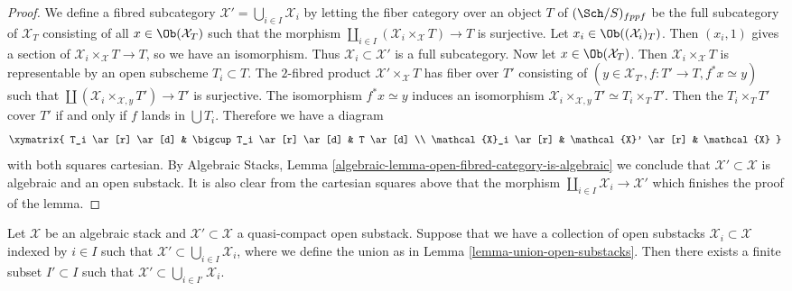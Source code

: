 \begin{proof}
We define a fibred subcategory
$\mathcal{X}' = \bigcup_{i \in I} \mathcal{X}_i$
by letting the fiber category over an object $T$ of $(\Sch/S)_{fppf}$
be the full subcategory of $\mathcal{X}_T$ consisting of all
$x \in \Ob(\mathcal{X}_T)$ such that the morphism
$\coprod_{i \in I} (\mathcal{X}_i \times_{\mathcal X} T) \to T$
is surjective. Let $x_i \in \Ob((\mathcal{X}_i)_T)$.
Then $(x_i, 1)$ gives a section of
$\mathcal{X}_i \times_{\mathcal X} T \to T$, so we have an isomorphism. Thus
$\mathcal{X}_i \subset \mathcal{X}'$ is a full subcategory.
Now let $x \in \Ob(\mathcal{X}_T)$. Then
$\mathcal{X}_i \times_{\mathcal X} T$ is representable
by an open subscheme $T_i \subset T$. The $2$-fibred product
$\mathcal{X}' \times_{\mathcal X} T$ has fiber over $T'$ consisting
of $(y \in \mathcal{X}_{T'}, f : T' \to T, f^*x \simeq y)$ such that
$\coprod (\mathcal{X}_i \times_{\mathcal X, y} T') \to T'$ is surjective.
The isomorphism $f^*x \simeq y$ induces an isomorphism
$\mathcal{X}_i \times_{\mathcal X, y} T' \simeq T_i \times_T T'$.
Then the $T_i \times_T T'$ cover $T'$ if and only if $f$ lands in
$\bigcup T_i$. Therefore we have a diagram
$$
\xymatrix{
T_i \ar[r] \ar[d] &
\bigcup T_i \ar[r] \ar[d] &
T \ar[d] \\
\mathcal{X}_i \ar[r] &
\mathcal{X}' \ar[r] &
\mathcal{X}
}
$$
with both squares cartesian. By
Algebraic Stacks, Lemma \ref{algebraic-lemma-open-fibred-category-is-algebraic}
we conclude that $\mathcal{X'} \subset \mathcal{X}$ is algebraic and an
open substack. It is also clear from the cartesian squares above that the
morphism $\coprod_{i \in I} \mathcal{X}_i \to \mathcal{X}'$ which
finishes the proof of the lemma.
\end{proof}

\begin{lemma}
\label{lemma-quasi-compact-finite-subcover}
Let $\mathcal X$ be an algebraic stack and $\mathcal X' \subset \mathcal X$
a quasi-compact open substack. Suppose that we have a collection of open
substacks $\mathcal{X}_i \subset \mathcal X$  indexed by $i \in I$ such
that $\mathcal{X}' \subset \bigcup_{i \in I} \mathcal{X}_i$,
where we define the union as in Lemma \ref{lemma-union-open-substacks}.
Then there exists a finite subset $I' \subset I$ such that
$\mathcal{X}' \subset \bigcup_{i \in I'} \mathcal{X}_i$.
\end{lemma}

